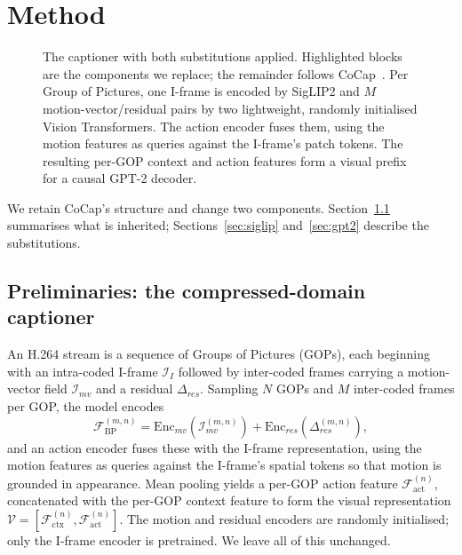 \documentclass[10pt,twocolumn,letterpaper]{article}
\begin{document}
\section{Method}
\label{sec:method}

\begin{figure}[t]
\centering
\resizebox{0.95\textwidth}{!}{}
\caption{The captioner with both substitutions applied. Highlighted blocks are the components we
replace; the remainder follows CoCap~\cite{cocap}. Per Group of Pictures, one I-frame is encoded
by SigLIP2 and $M$ motion-vector/residual pairs by two lightweight, randomly initialised Vision
Transformers. The action encoder fuses them, using the motion features as queries against the
I-frame's patch tokens. The resulting per-GOP context and action features form a visual prefix
for a causal GPT-2 decoder.}
\label{fig:arch}
\end{figure}

We retain CoCap's structure and change two components. Section~\ref{sec:prelim} summarises what
is inherited; Sections~\ref{sec:siglip} and~\ref{sec:gpt2} describe the substitutions.

\subsection{Preliminaries: the compressed-domain captioner}
\label{sec:prelim}

An H.264 stream is a sequence of Groups of Pictures (GOPs), each beginning with an intra-coded
I-frame $\mathcal{I}_{I}$ followed by inter-coded frames carrying a motion-vector field
$\mathcal{I}_{mv}$ and a residual $\Delta_{res}$. Sampling $N$ GOPs and $M$ inter-coded frames
per GOP, the model encodes
\begin{equation}
\mathcal{F}^{(m,n)}_{\mathrm{BP}} =
  \mathrm{Enc}_{mv}\!\left(\mathcal{I}^{(m,n)}_{mv}\right) +
  \mathrm{Enc}_{res}\!\left(\Delta^{(m,n)}_{res}\right),
\end{equation}
and an action encoder fuses these with the I-frame representation, using the motion features as
queries against the I-frame's spatial tokens so that motion is grounded in appearance. Mean
pooling yields a per-GOP action feature $\mathcal{F}^{(n)}_{\mathrm{act}}$, concatenated with the
per-GOP context feature to form the visual representation
$\mathcal{V} = [\mathcal{F}^{(n)}_{\mathrm{ctx}}, \mathcal{F}^{(n)}_{\mathrm{act}}]$.
The motion and residual encoders are randomly initialised; only the I-frame encoder is
pretrained. We leave all of this unchanged.
\end{document}
